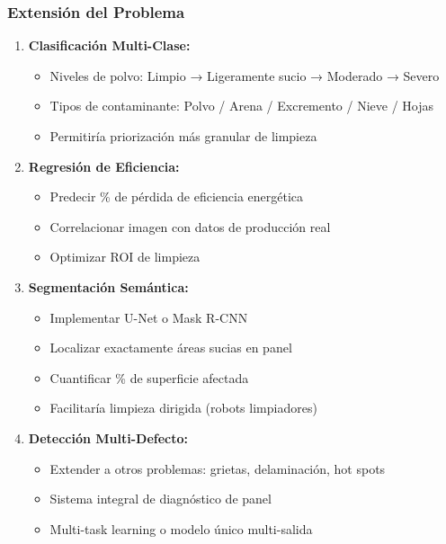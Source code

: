 \documentclass[11pt, a4paper]{article}
\begin{document}
\subsubsection{Extensión del Problema}

\begin{enumerate}
    \item \textbf{Clasificación Multi-Clase:}
    \begin{itemize}
        \item Niveles de polvo: Limpio → Ligeramente sucio → Moderado → Severo
        \item Tipos de contaminante: Polvo / Arena / Excremento / Nieve / Hojas
        \item Permitiría priorización más granular de limpieza
    \end{itemize}
    
    \item \textbf{Regresión de Eficiencia:}
    \begin{itemize}
        \item Predecir \% de pérdida de eficiencia energética
        \item Correlacionar imagen con datos de producción real
        \item Optimizar ROI de limpieza
    \end{itemize}
    
    \item \textbf{Segmentación Semántica:}
    \begin{itemize}
        \item Implementar U-Net o Mask R-CNN
        \item Localizar exactamente áreas sucias en panel
        \item Cuantificar \% de superficie afectada
        \item Facilitaría limpieza dirigida (robots limpiadores)
    \end{itemize}
    
    \item \textbf{Detección Multi-Defecto:}
    \begin{itemize}
        \item Extender a otros problemas: grietas, delaminación, hot spots
        \item Sistema integral de diagnóstico de panel
        \item Multi-task learning o modelo único multi-salida
    \end{itemize}
\end{enumerate}
\end{document}

